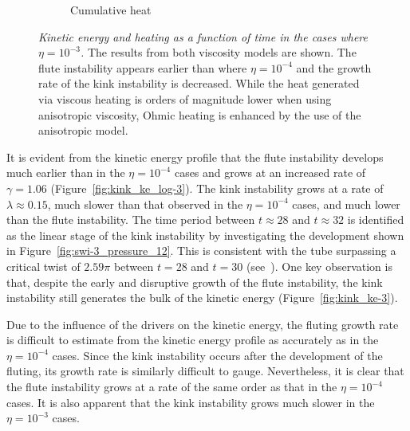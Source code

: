 \documentclass[fleqn,usenatbib]{mnras}
\newcommand{\rev}[1]{{\color{red} {#1}}}
\newcommand{\mycaption}[2]{\caption[#1]{\emph{#1} #2}}
\begin{document}
\begin{figure}
\begin{subfigure}{0.32\textwidth}
      \caption{Cumulative heat}
      \label{fig:heating_r-3}
    \end{subfigure}
\mycaption{Kinetic energy \rev{and heating} as a function of time in the cases where
$\eta=10^{-3}$.}{The results from both viscosity models are shown. The flute
instability appears earlier than where $\eta=10^{-4}$ and the growth rate of
the kink instability is decreased. \rev{While the heat generated via viscous heating is orders of magnitude lower when using anisotropic viscosity, Ohmic heating is enhanced by the use of the anisotropic model.}}
\label{fig:kink_str8_ke-3}%
\end{figure}

It is evident from the kinetic energy profile that the flute instability
develops much earlier than in the $\eta=10^{-4}$ cases and grows at an
increased rate of $\gamma = 1.06$ (Figure~\ref{fig:kink_ke_log-3}). The kink
instability grows at a rate of $\lambda \approx 0.15$, much slower than that
observed in the $\eta=10^{-4}$ cases, and much lower than the flute
instability. \rev{The time period between $t\approx28$ and $t\approx32$ is
identified as the linear stage of the kink instability by investigating the
development shown in Figure~\ref{fig:swi-3_pressure_12}. This is consistent with the tube surpassing a critical twist of $2.59\pi$ between $t=28$ and $t=30$ (see~\citet{Torok2003}).} One key observation
is that, despite the early and disruptive growth of the flute instability, the
kink instability still generates the bulk of the kinetic energy
(Figure~\ref{fig:kink_ke-3}).

Due to the influence of the drivers on the kinetic energy, the fluting growth
rate is difficult to estimate from the kinetic energy profile as accurately as
in the $\eta=10^{-4}$ cases. Since the kink instability occurs after the
development of the fluting, its growth rate is similarly difficult to gauge.
Nevertheless, it is clear that the flute instability grows at a rate of the
same order as that in the $\eta=10^{-4}$ cases. It is also apparent that the
kink instability grows much slower in the $\eta=10^{-3}$ cases.
\end{document}

